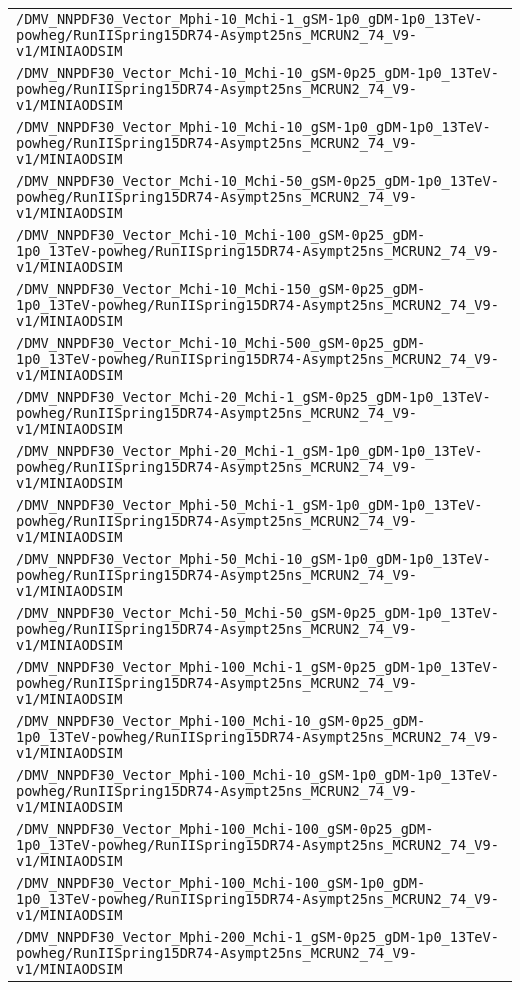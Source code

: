 \begin{center}
\begin{tabular}{l}
\verb!/DMV_NNPDF30_Vector_Mphi-10_Mchi-1_gSM-1p0_gDM-1p0_13TeV-powheg/RunIISpring15DR74-Asympt25ns_MCRUN2_74_V9-v1/MINIAODSIM! \tabularnewline
\verb!/DMV_NNPDF30_Vector_Mchi-10_Mchi-10_gSM-0p25_gDM-1p0_13TeV-powheg/RunIISpring15DR74-Asympt25ns_MCRUN2_74_V9-v1/MINIAODSIM! \tabularnewline
\verb!/DMV_NNPDF30_Vector_Mphi-10_Mchi-10_gSM-1p0_gDM-1p0_13TeV-powheg/RunIISpring15DR74-Asympt25ns_MCRUN2_74_V9-v1/MINIAODSIM! \tabularnewline
\verb!/DMV_NNPDF30_Vector_Mchi-10_Mchi-50_gSM-0p25_gDM-1p0_13TeV-powheg/RunIISpring15DR74-Asympt25ns_MCRUN2_74_V9-v1/MINIAODSIM! \tabularnewline
\verb!/DMV_NNPDF30_Vector_Mchi-10_Mchi-100_gSM-0p25_gDM-1p0_13TeV-powheg/RunIISpring15DR74-Asympt25ns_MCRUN2_74_V9-v1/MINIAODSIM! \tabularnewline
\verb!/DMV_NNPDF30_Vector_Mchi-10_Mchi-150_gSM-0p25_gDM-1p0_13TeV-powheg/RunIISpring15DR74-Asympt25ns_MCRUN2_74_V9-v1/MINIAODSIM! \tabularnewline
\verb!/DMV_NNPDF30_Vector_Mchi-10_Mchi-500_gSM-0p25_gDM-1p0_13TeV-powheg/RunIISpring15DR74-Asympt25ns_MCRUN2_74_V9-v1/MINIAODSIM! \tabularnewline
\verb!/DMV_NNPDF30_Vector_Mchi-20_Mchi-1_gSM-0p25_gDM-1p0_13TeV-powheg/RunIISpring15DR74-Asympt25ns_MCRUN2_74_V9-v1/MINIAODSIM! \tabularnewline
\verb!/DMV_NNPDF30_Vector_Mphi-20_Mchi-1_gSM-1p0_gDM-1p0_13TeV-powheg/RunIISpring15DR74-Asympt25ns_MCRUN2_74_V9-v1/MINIAODSIM! \tabularnewline
\verb!/DMV_NNPDF30_Vector_Mphi-50_Mchi-1_gSM-1p0_gDM-1p0_13TeV-powheg/RunIISpring15DR74-Asympt25ns_MCRUN2_74_V9-v1/MINIAODSIM! \tabularnewline
\verb!/DMV_NNPDF30_Vector_Mphi-50_Mchi-10_gSM-1p0_gDM-1p0_13TeV-powheg/RunIISpring15DR74-Asympt25ns_MCRUN2_74_V9-v1/MINIAODSIM! \tabularnewline
\verb!/DMV_NNPDF30_Vector_Mchi-50_Mchi-50_gSM-0p25_gDM-1p0_13TeV-powheg/RunIISpring15DR74-Asympt25ns_MCRUN2_74_V9-v1/MINIAODSIM! \tabularnewline
\verb!/DMV_NNPDF30_Vector_Mphi-100_Mchi-1_gSM-0p25_gDM-1p0_13TeV-powheg/RunIISpring15DR74-Asympt25ns_MCRUN2_74_V9-v1/MINIAODSIM! \tabularnewline
\verb!/DMV_NNPDF30_Vector_Mphi-100_Mchi-10_gSM-0p25_gDM-1p0_13TeV-powheg/RunIISpring15DR74-Asympt25ns_MCRUN2_74_V9-v1/MINIAODSIM! \tabularnewline
\verb!/DMV_NNPDF30_Vector_Mphi-100_Mchi-10_gSM-1p0_gDM-1p0_13TeV-powheg/RunIISpring15DR74-Asympt25ns_MCRUN2_74_V9-v1/MINIAODSIM! \tabularnewline
\verb!/DMV_NNPDF30_Vector_Mphi-100_Mchi-100_gSM-0p25_gDM-1p0_13TeV-powheg/RunIISpring15DR74-Asympt25ns_MCRUN2_74_V9-v1/MINIAODSIM! \tabularnewline
\verb!/DMV_NNPDF30_Vector_Mphi-100_Mchi-100_gSM-1p0_gDM-1p0_13TeV-powheg/RunIISpring15DR74-Asympt25ns_MCRUN2_74_V9-v1/MINIAODSIM! \tabularnewline
\verb!/DMV_NNPDF30_Vector_Mphi-200_Mchi-1_gSM-0p25_gDM-1p0_13TeV-powheg/RunIISpring15DR74-Asympt25ns_MCRUN2_74_V9-v1/MINIAODSIM! \tabularnewline

\end{tabular}
\end{center}
